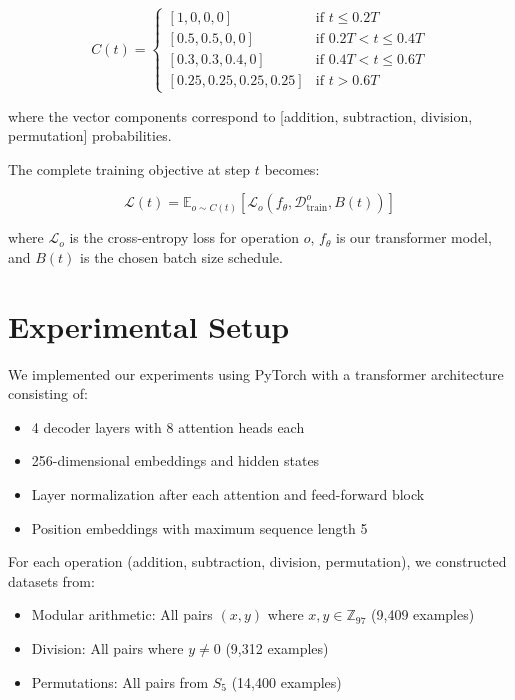 \documentclass{article} %
\begin{document}
\begin{equation}
    C(t) = \begin{cases}
        [1,0,0,0] & \text{if } t \leq 0.2T \\
        [0.5,0.5,0,0] & \text{if } 0.2T < t \leq 0.4T \\
        [0.3,0.3,0.4,0] & \text{if } 0.4T < t \leq 0.6T \\
        [0.25,0.25,0.25,0.25] & \text{if } t > 0.6T
    \end{cases}
\end{equation}

where the vector components correspond to [addition, subtraction, division, permutation] probabilities.

The complete training objective at step $t$ becomes:

\begin{equation}
    \mathcal{L}(t) = \mathbb{E}_{o \sim C(t)} \left[ \mathcal{L}_o\left(f_\theta, \mathcal{D}_{\text{train}}^o, B(t)\right) \right]
\end{equation}

where $\mathcal{L}_o$ is the cross-entropy loss for operation $o$, $f_\theta$ is our transformer model, and $B(t)$ is the chosen batch size schedule.

\section{Experimental Setup}
\label{sec:experimental}

We implemented our experiments using PyTorch \citep{paszke2019pytorch} with a transformer architecture consisting of:

\begin{itemize}
    \item 4 decoder layers with 8 attention heads each
    \item 256-dimensional embeddings and hidden states
    \item Layer normalization \citep{ba2016layer} after each attention and feed-forward block
    \item Position embeddings with maximum sequence length 5
\end{itemize}

For each operation (addition, subtraction, division, permutation), we constructed datasets from:
\begin{itemize}
    \item Modular arithmetic: All pairs $(x,y)$ where $x,y \in \mathbb{Z}_{97}$ (9,409 examples)
    \item Division: All pairs where $y \neq 0$ (9,312 examples)
    \item Permutations: All pairs from $S_5$ (14,400 examples)
\end{itemize}
\end{document}
